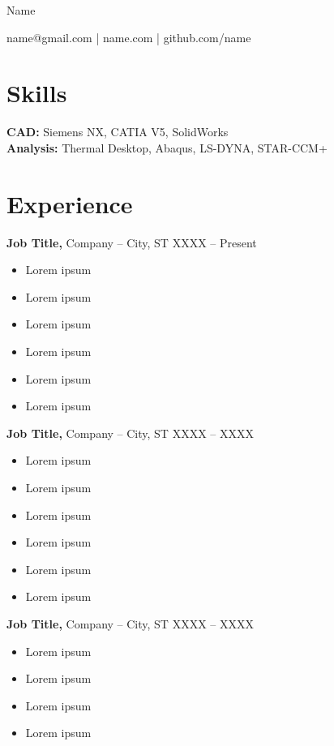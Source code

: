 \documentclass[11pt,letterpaper]{article}
\begin{document}
\centerline{\Huge Name}
\centerline{name@gmail.com | name.com | github.com/name}

\section*{Skills}
\textbf{CAD:} Siemens NX, CATIA V5, SolidWorks \\
\textbf{Analysis:} Thermal Desktop, Abaqus, LS-DYNA, STAR-CCM+

\vspace{-6.5pt}

\section*{Experience}
\textbf{Job Title,} Company -- City, ST \hfill XXXX -- Present \\
\vspace{-10pt}
\begin{itemize}
  \item Lorem ipsum
  \item Lorem ipsum
  \item Lorem ipsum
  \item Lorem ipsum
  \item Lorem ipsum
  \item Lorem ipsum
\end{itemize}

\textbf{Job Title,} Company -- City, ST \hfill XXXX -- XXXX \\
\vspace{-10pt}
\begin{itemize}
  \item Lorem ipsum
  \item Lorem ipsum
  \item Lorem ipsum
  \item Lorem ipsum
  \item Lorem ipsum
  \item Lorem ipsum
\end{itemize}

\textbf{Job Title,} Company -- City, ST \hfill XXXX -- XXXX \\
\vspace{-10pt}
\begin{itemize}
  \item Lorem ipsum
  \item Lorem ipsum
  \item Lorem ipsum
  \item Lorem ipsum
\end{itemize}
\end{document}
